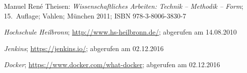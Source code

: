 \documentclass[12pt,toc=bib,toc=listof]{scrreprt}
\begin{document}
\appendix
\begin{thebibliography}{99}
\raggedright
 Manuel René Theisen:
 \emph{Wissenschaftliches Arbeiten: Technik -- Methodik -- Form};
 15.~Auflage; Vahlen; München 2011;
 ISBN 978-3-8006-3830-7

 \emph{Hochschule Heilbronn};
 \url{http://www.hs-heilbronn.de/};
 abgerufen am 14.08.2010
 
 \emph{Jenkins};
 \url{https://jenkins.io/};
 abgerufen am 02.12.2016
 
 \emph{Docker};
 \url{https://www.docker.com/what-docker};
 abgerufen am 02.12.2016

 
 
 
 
 
 
\end{thebibliography}
\end{document}
